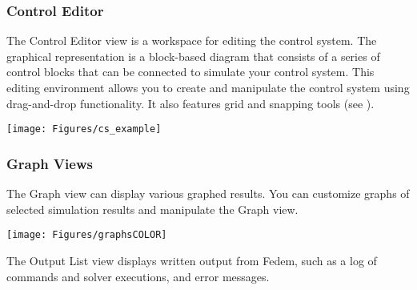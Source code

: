 \subsubsection{Control Editor}

The Control Editor view is a workspace for editing the control system.
The graphical representation is a block-based diagram that consists of a series
of control blocks that can be connected to simulate your control system.
This editing environment allows you to create and manipulate the control system
using drag-and-drop functionality. It also features grid and snapping tools
(see ).


\begin{center}
  \texttt{[image: Figures/cs\_example]}
\end{center}


\subsubsection{Graph Views}

The Graph view can display various graphed results. You can customize graphs
of selected simulation results and manipulate the Graph view.


\begin{center}
  \texttt{[image: Figures/graphsCOLOR]}
\end{center}


\def\OutputList{\protect\hyperlink{output-list}{\sl Output List}~}

The Output List view displays written output from Fedem,
such as a log of commands and solver executions, and error messages.

